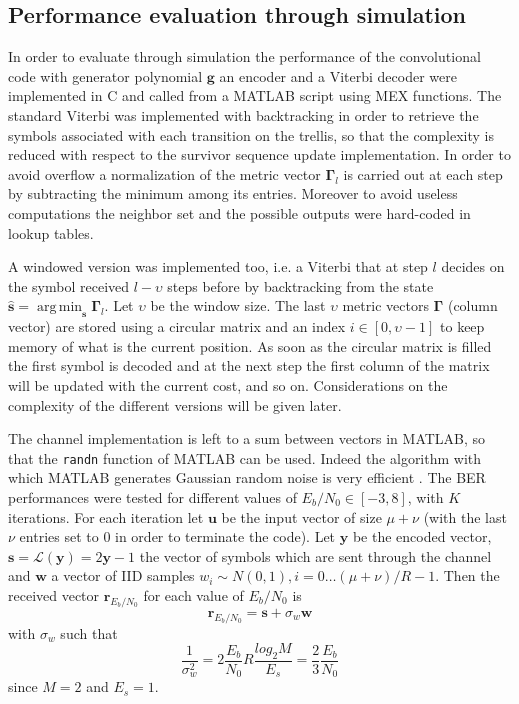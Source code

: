 \documentclass[10pt]{article}
\DeclareMathOperator*{\argmin}{arg\,min}
\begin{document}
\subsection{Performance evaluation through simulation}

In order to evaluate through simulation the performance of the convolutional code with generator polynomial $\mathbf{g}$ an encoder and a Viterbi decoder were implemented in C and called from a MATLAB script using MEX functions. The standard Viterbi was implemented with backtracking in order to retrieve the symbols associated with each transition on the trellis, so that the complexity is reduced with respect to the survivor sequence update implementation. In order to avoid overflow a normalization of the metric vector $\mathbf{\Gamma}_l$ is carried out at each step by subtracting the minimum among its entries. Moreover to avoid useless computations the neighbor set and the possible outputs were hard-coded in lookup tables. 

A windowed version was implemented too, i.e. a Viterbi that at step $l$ decides on the symbol received $l - \upsilon$ steps before by backtracking from the state $\mathbf{\hat{s}} = \argmin_{\mathbf{s}} \mathbf{\Gamma}_l$. Let $\upsilon$ be the window size. The last $\upsilon$ metric vectors $\mathbf{\Gamma}$ (column vector) are stored using a circular matrix and an index $i\in[0, \upsilon-1]$ to keep memory of what is the current position. As soon as the circular matrix is filled the first symbol is decoded and at the next step the first column of the matrix will be updated with the current cost, and so on. Considerations on the complexity of the different versions will be given later. 

The channel implementation is left to a sum between vectors in MATLAB, so that the \texttt{randn} function of MATLAB can be used. Indeed the algorithm with which MATLAB generates Gaussian random noise is very efficient \cite{moler}. 
The BER performances were tested for different values of $E_b/N_0 \in [-3, 8]$, with $K$ iterations. For each iteration let $\mathbf{u}$ be the input vector of size $\mu + \nu$ (with the last $\nu$ entries set to $0$ in order to terminate the code). Let $\mathbf{y}$ be the encoded vector, $\mathbf{s} = \mathcal{L}(\mathbf{y}) = 2\mathbf{y} - 1$ the vector of symbols which are sent through the channel and $\mathbf{w}$ a vector of IID samples $w_i \sim N(0,1), i = 0 \dots (\mu + \nu)/R - 1$. Then the received vector $\mathbf{r}_{E_b/N_0}$ for each value of $E_b/N_0$ is 
\begin{equation}
	\mathbf{r}_{E_b/N_0} = \mathbf{s} + \sigma_w \mathbf{w}
\end{equation}
with $\sigma_w$ such that
\begin{equation}
	\frac{1}{\sigma_w^2} = 2\frac{E_b}{N_0}R\frac{log_2M}{E_s} = \frac{2}{3} \frac{E_b}{N_0}
\end{equation}
since $M=2$ and $E_s = 1$.
\end{document}
